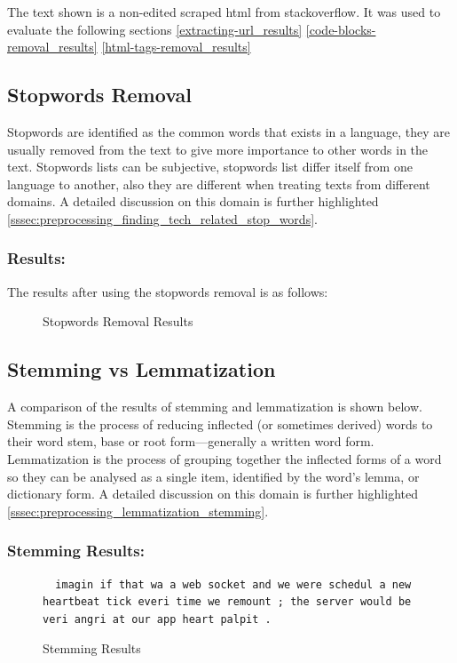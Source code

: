 \noindent The text shown is a non-edited scraped html from stackoverflow. It was used to evaluate the following sections \ref{extracting-url_results} \ref{code-blocks-removal_results} \ref{html-tags-removal_results}

\subsection{Stopwords Removal} \label{stopwords-removal_results}
Stopwords are identified as the common words that exists in a language, they are usually removed from the text to give more importance to other words in the text. Stopwords lists can be subjective, stopwords list differ itself from one language to another, also they are different when treating texts from different domains. A detailed discussion on this domain is further highlighted \ref{sssec:preprocessing_finding_tech_related_stop_words}.

\subsubsection{Results:} \label{stopwords-removal_results_results}
The results after using the stopwords removal is as follows:

\begin{figure}[H]
  \noindent{}
  \caption{Stopwords Removal Results}
  \label{fig:stopwords-removal_results}
\end{figure}

\hspace{1cm}

\subsection{Stemming vs Lemmatization} \label{stemming-vs-lemmatization_results}
A comparison of the results of stemming and lemmatization is shown below. Stemming is the process of reducing inflected (or sometimes derived) words to their word stem, base or root form—generally a written word form. Lemmatization is the process of grouping together the inflected forms of a word so they can be analysed as a single item, identified by the word's lemma, or dictionary form. A detailed discussion on this domain is further highlighted \ref{sssec:preprocessing_lemmatization_stemming}.

\subsubsection{Stemming Results:} \label{stemming-vs-lemmatization_results_results_2}
\begin{figure}[H]
\noindent\begin{lstlisting}
  imagin if that wa a web socket and we were schedul a new heartbeat tick everi time we remount ; the server would be veri angri at our app heart palpit .
\end{lstlisting}

\caption{Stemming Results}
\label{fig:stemming-vs-lemmatization_results_results_2}
\end{figure}
